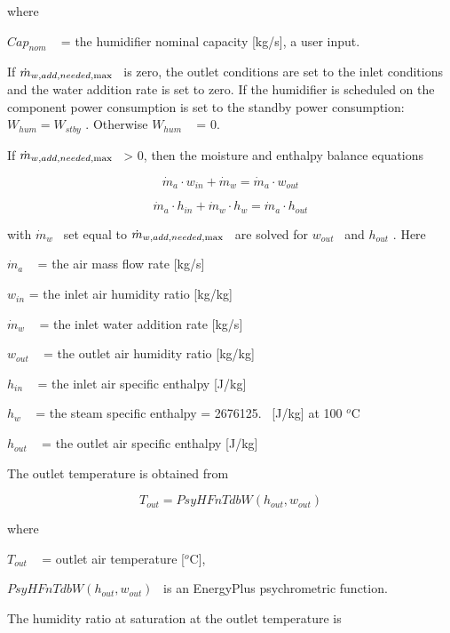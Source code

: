 where

\(Ca{p_{nom}}\) ~ = the humidifier nominal capacity {[}kg/s{]}, a user input.

If \({\dot m_{w,add,needed,{\rm{max}}}}\) ~is zero, the outlet conditions are set to the inlet conditions and the water addition rate is set to zero. If the humidifier is scheduled on the component power consumption is set to the standby power consumption: \({W_{hum}} = {W_{stby}}\) . Otherwise \({W_{hum}}\) ~ = 0.

If \({\dot m_{w,add,needed,{\rm{max}}}}\) ~\textgreater{} 0, then the moisture and enthalpy balance equations

\begin{equation}
{\dot m_a} \cdot {w_{in}} + {\dot m_w} = {\dot m_a} \cdot {w_{out}}
\end{equation}

\begin{equation}
{\dot m_a} \cdot {h_{in}} + {\dot m_w} \cdot {h_w} = {\dot m_a} \cdot {h_{out}}
\end{equation}

with \({\dot m_w}\) ~set equal to \({\dot m_{w,add,needed,{\rm{max}}}}\) ~are solved for \({w_{out}}\) ~and \({h_{out}}\) . Here

\({\dot m_a}\) ~ = the air mass flow rate {[}kg/s{]}

\({w_{in}}\) = the inlet air humidity ratio {[}kg/kg{]}

\({\dot m_w}\) ~ = the inlet water addition rate {[}kg/s{]}

\({w_{out}}\) ~ = the outlet air humidity ratio {[}kg/kg{]}

\({h_{in}}\) ~ = the inlet air specific enthalpy {[}J/kg{]}

\({h_w}\) ~ = the steam specific enthalpy = 2676125.~ {[}J/kg{]} at 100 \(^{o}\)C

\({h_{out}}\) ~ = the outlet air specific enthalpy {[}J/kg{]}

The outlet temperature is obtained from

\begin{equation}
{T_{out}} = PsyHFnTdbW({h_{out}},{w_{out}})
\end{equation}

where

\({T_{out}}\) ~ = outlet air temperature {[}\(^{o}\)C{]},

\(PsyHFnTdbW({h_{out}},{w_{out}})\) ~is an EnergyPlus psychrometric function.

The humidity ratio at saturation at the outlet temperature is

